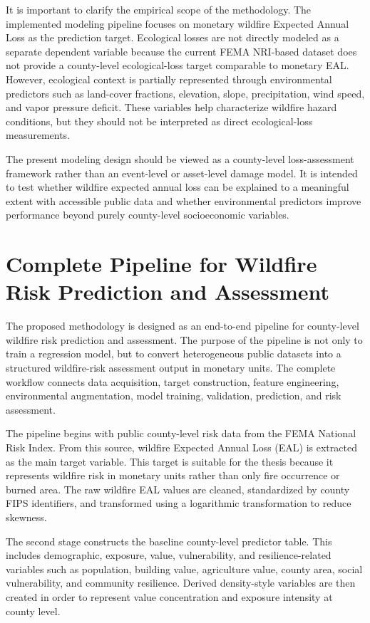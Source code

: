 It is important to clarify the empirical scope of the methodology. The implemented modeling pipeline focuses on monetary wildfire Expected Annual Loss as the prediction target. Ecological losses are not directly modeled as a separate dependent variable because the current FEMA NRI-based dataset does not provide a county-level ecological-loss target comparable to monetary EAL. However, ecological context is partially represented through environmental predictors such as land-cover fractions, elevation, slope, precipitation, wind speed, and vapor pressure deficit. These variables help characterize wildfire hazard conditions, but they should not be interpreted as direct ecological-loss measurements.

The present modeling design should be viewed as a county-level loss-assessment framework rather than an event-level or asset-level damage model. It is intended to test whether wildfire expected annual loss can be explained to a meaningful extent with accessible public data and whether environmental predictors improve performance beyond purely county-level socioeconomic variables.

\section{Complete Pipeline for Wildfire Risk Prediction and Assessment}
\label{sec:complete_pipeline}

The proposed methodology is designed as an end-to-end pipeline for county-level wildfire risk prediction and assessment. The purpose of the pipeline is not only to train a regression model, but to convert heterogeneous public datasets into a structured wildfire-risk assessment output in monetary units. The complete workflow connects data acquisition, target construction, feature engineering, environmental augmentation, model training, validation, prediction, and risk assessment.

The pipeline begins with public county-level risk data from the FEMA National Risk Index. From this source, wildfire Expected Annual Loss (EAL) is extracted as the main target variable. This target is suitable for the thesis because it represents wildfire risk in monetary units rather than only fire occurrence or burned area. The raw wildfire EAL values are cleaned, standardized by county FIPS identifiers, and transformed using a logarithmic transformation to reduce skewness.

The second stage constructs the baseline county-level predictor table. This includes demographic, exposure, value, vulnerability, and resilience-related variables such as population, building value, agriculture value, county area, social vulnerability, and community resilience. Derived density-style variables are then created in order to represent value concentration and exposure intensity at county level.

